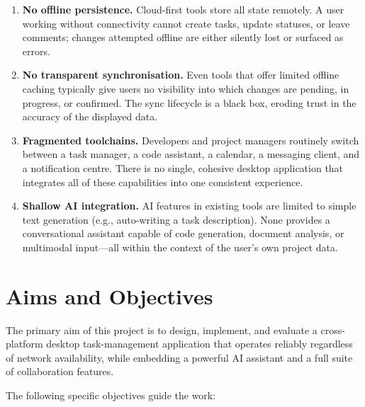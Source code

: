 \begin{enumerate}
    \item \textbf{No offline persistence.}
          Cloud-first tools store all state remotely. A user working without connectivity
          cannot create tasks, update statuses, or leave comments; changes attempted offline
          are either silently lost or surfaced as errors.

    \item \textbf{No transparent synchronisation.}
          Even tools that offer limited offline caching typically give users no visibility into
          which changes are pending, in progress, or confirmed. The sync lifecycle is a
          black box, eroding trust in the accuracy of the displayed data.

    \item \textbf{Fragmented toolchains.}
          Developers and project managers routinely switch between a task manager, a code
          assistant, a calendar, a messaging client, and a notification centre.
          There is no single, cohesive desktop application that integrates all of these
          capabilities into one consistent experience.

    \item \textbf{Shallow AI integration.}
          AI features in existing tools are limited to simple text generation (e.g.,
          auto-writing a task description). None provides a conversational assistant
          capable of code generation, document analysis, or multimodal input---all
          within the context of the user's own project data.
\end{enumerate}

\section{Aims and Objectives}\label{sec:intro_aims}

The primary aim of this project is to design, implement, and evaluate a cross-platform
desktop task-management application that operates reliably regardless of network
availability, while embedding a powerful AI assistant and a full suite of collaboration
features.

The following specific objectives guide the work:


